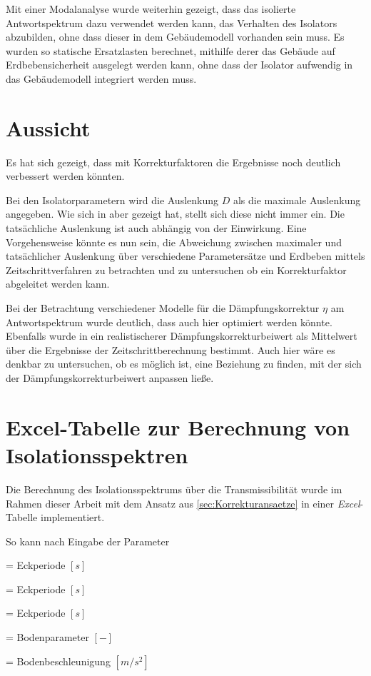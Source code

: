 Mit einer Modalanalyse wurde weiterhin gezeigt, dass das isolierte Antwortspektrum dazu verwendet werden kann, das Verhalten des Isolators abzubilden, ohne dass dieser in dem Gebäudemodell vorhanden sein muss.
Es wurden so statische Ersatzlasten berechnet, mithilfe derer das Gebäude auf Erdbebensicherheit ausgelegt werden kann, ohne dass der Isolator aufwendig in das Gebäudemodell integriert werden muss.

\section{Aussicht}

Es hat sich gezeigt, dass mit Korrekturfaktoren die Ergebnisse noch deutlich verbessert werden könnten.

Bei den Isolatorparametern wird die Auslenkung $D$ als die maximale Auslenkung angegeben. Wie sich in \cite{Isemann} aber gezeigt hat, stellt sich diese nicht immer ein. Die tatsächliche Auslenkung ist auch abhängig von der Einwirkung.
Eine Vorgehensweise könnte es nun sein, die Abweichung zwischen maximaler und tatsächlicher Auslenkung über verschiedene Parametersätze und Erdbeben mittels Zeitschrittverfahren zu betrachten und zu untersuchen ob ein Korrekturfaktor abgeleitet werden kann.

Bei der Betrachtung verschiedener Modelle für die Dämpfungskorrektur $\eta$ am Antwortspektrum wurde deutlich, dass auch hier optimiert werden könnte. Ebenfalls wurde in \cite{Isemann} ein realistischerer Dämpfungskorrekturbeiwert als Mittelwert über die Ergebnisse der Zeitschrittberechnung bestimmt. Auch hier wäre es denkbar zu untersuchen, ob es möglich ist, eine Beziehung zu finden, mit der sich der Dämpfungskorrekturbeiwert anpassen ließe.

\section{Excel-Tabelle zur Berechnung von Isolationsspektren}

Die Berechnung des Isolationsspektrums über die Transmissibilität wurde im Rahmen dieser Arbeit mit dem Ansatz aus \cref{sec:Korrekturansaetze} in einer \emph{Excel}-Tabelle implementiert.

So kann nach Eingabe der Parameter 

  = Eckperiode $[s]$ \par
{}  = Eckperiode $[s]$ \par
{}  = Eckperiode $[s]$ \par
{}    = Bodenparameter $[-]$ \par
{}  = Bodenbeschleunigung $[m/s^2]$ \par

